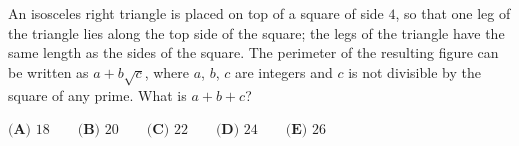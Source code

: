 An isosceles right triangle is placed on top of a square of side $4$, so that one leg of the triangle lies along the top side of the square; the legs of the triangle have the same length as the sides of the square. The perimeter of the resulting figure can be written as $a+b\sqrt c$, where $a$, $b$, $c$ are integers and $c$ is not divisible by the square of any prime. What is $a+b+c$?

$\textbf{(A) }18\qquad\textbf{(B) }20\qquad\textbf{(C) }22\qquad\textbf{(D) }24\qquad\textbf{(E) }26$

